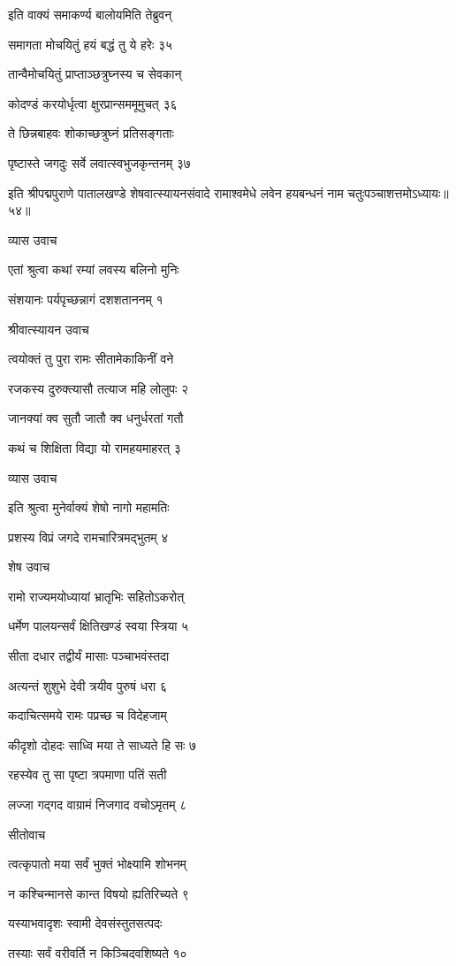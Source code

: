 इति वाक्यं समाकर्ण्य बालोयमिति तेब्रुवन्

समागता मोचयितुं हयं बद्धं तु ये हरेः ३५

तान्वैमोचयितुं प्राप्ताञ्छत्रुघ्नस्य च सेवकान्

कोदण्डं करयोर्धृत्वा क्षुरप्रान्सममूमुचत् ३६

ते छिन्नबाहवः शोकाच्छत्रुघ्नं प्रतिसङ्गताः

पृष्टास्ते जगदुः सर्वे लवात्स्वभुजकृन्तनम् ३७

इति श्रीपद्मपुराणे पातालखण्डे शेषवात्स्यायनसंवादे रामाश्वमेधे लवेन हयबन्धनं नाम चतुःपञ्चाशत्तमोऽध्यायः॥५४॥


व्यास उवाच

एतां श्रुत्वा कथां रम्यां लवस्य बलिनो मुनिः

संशयानः पर्यपृच्छन्नागं दशशताननम् १

श्रीवात्स्यायन उवाच

त्वयोक्तं तु पुरा रामः सीतामेकाकिनीं वने

रजकस्य दुरुक्त्यासौ तत्याज महि लोलुपः २

जानक्यां क्व सुतौ जातौ क्व धनुर्धरतां गतौ

कथं च शिक्षिता विद्या यो रामहयमाहरत् ३

व्यास उवाच

इति श्रुत्वा मुनेर्वाक्यं शेषो नागो महामतिः

प्रशस्य विप्रं जगदे रामचारित्रमद्भुतम् ४

शेष उवाच

रामो राज्यमयोध्यायां भ्रातृभिः सहितोऽकरोत्

धर्मेण पालयन्सर्वं क्षितिखण्डं स्वया स्त्रिया ५

सीता दधार तद्वीर्यं मासाः पञ्चाभवंस्तदा

अत्यन्तं शुशुभे देवी त्रयीव पुरुषं धरा ६

कदाचित्समये रामः पप्रच्छ च विदेहजाम्

कीदृशो दोहदः साध्वि मया ते साध्यते हि सः ७

रहस्येव तु सा पृष्टा त्रपमाणा पतिं सती

लज्जा गद्गद वाग्रामं निजगाद वचोऽमृतम् ८

सीतोवाच

त्वत्कृपातो मया सर्वं भुक्तं भोक्ष्यामि शोभनम्

न कश्चिन्मानसे कान्त विषयो ह्यतिरिच्यते ९

यस्याभवादृशः स्वामी देवसंस्तुतसत्पदः

तस्याः सर्वं वरीवर्ति न किञ्चिदवशिष्यते १०

